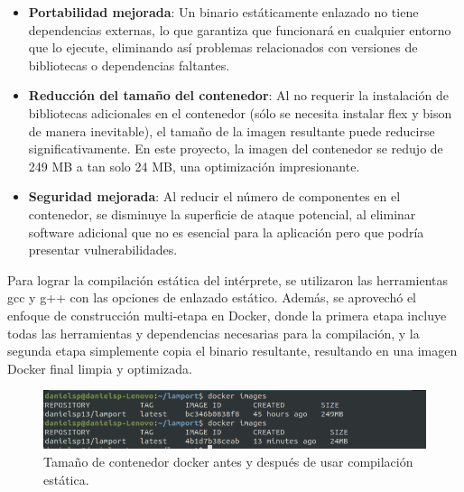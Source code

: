 \begin{itemize}
\item \textbf{Portabilidad mejorada}: Un binario estáticamente enlazado no tiene dependencias externas, lo que garantiza que funcionará en cualquier entorno que lo ejecute, eliminando así problemas relacionados con versiones de bibliotecas o dependencias faltantes.
\item \textbf{Reducción del tamaño del contenedor}: Al no requerir la instalación de bibliotecas adicionales en el contenedor (sólo se necesita instalar flex y bison de manera inevitable), el tamaño de la imagen resultante puede reducirse significativamente. En este proyecto, la imagen del contenedor se redujo de 249 MB a tan solo 24 MB, una optimización impresionante.
\item \textbf{Seguridad mejorada}: Al reducir el número de componentes en el contenedor, se disminuye la superficie de ataque potencial, al eliminar software adicional que no es esencial para la aplicación pero que podría presentar vulnerabilidades.
\end{itemize}

Para lograr la compilación estática del intérprete, se utilizaron las herramientas gcc y g++ con las opciones de enlazado estático. Además, se aprovechó el enfoque de construcción multi-etapa en Docker, donde la primera etapa incluye todas las herramientas y dependencias necesarias para la compilación, y la segunda etapa simplemente copia el binario resultante, resultando en una imagen Docker final limpia y optimizada.

\begin{figure}[h]
    \begin{adjustbox}{center}
        \includegraphics[width=\linewidth]{images/implementacion/docker/docker_reduce.png}
    \end{adjustbox}
    \caption{Tamaño de contenedor docker antes y después de usar compilación estática.}
    \label{fig:DockerReduce}
\end{figure}